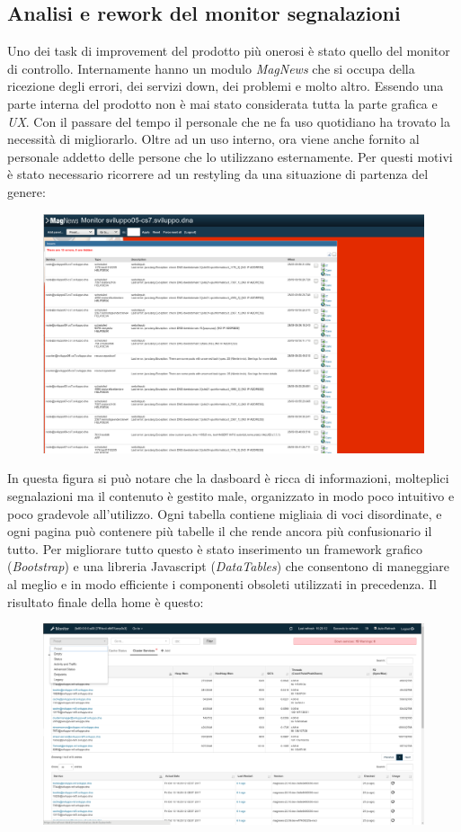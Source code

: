 \documentclass[a4paper]{article}
\begin{document}
\subsection{Analisi e rework del monitor segnalazioni}
\par Uno dei task di improvement del prodotto più onerosi è stato quello del monitor di controllo.
Internamente hanno un modulo \emph{MagNews} che si occupa della ricezione degli errori,
dei servizi down, dei problemi e molto altro. Essendo una parte interna del prodotto
non è mai stato considerata tutta la parte grafica e \emph{UX}. Con il passare del tempo
il personale che ne fa uso quotidiano ha trovato la necessità di migliorarlo.
Oltre ad un uso interno, ora viene anche fornito al personale addetto delle persone che
lo utilizzano esternamente. Per questi motivi è stato necessario ricorrere ad un restyling
da una situazione di partenza del genere:
\begin{figure}[H]
	\includegraphics[width=\textwidth]{dashboard_old.png}
	\centering
\end{figure}
In questa figura si può notare che la dasboard è ricca di informazioni, molteplici segnalazioni
ma il contenuto è gestito male, organizzato in modo poco intuitivo e poco gradevole all'utilizzo.
Ogni tabella contiene migliaia di voci disordinate, e ogni pagina può contenere più tabelle
il che rende ancora più confusionario il tutto. Per migliorare tutto questo è stato inserimento
un framework grafico (\emph{Bootstrap}) e una libreria Javascript (\emph{DataTables}) che consentono
di maneggiare al meglio e in modo efficiente i componenti obsoleti utilizzati in precedenza.
Il risultato finale della home è questo:
\begin{figure}[H]
	\includegraphics[width=\textwidth]{dashboard_new.png}
	\centering
\end{figure}
\end{document}
